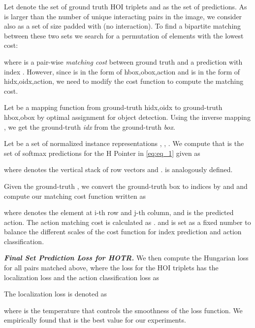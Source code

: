 \documentclass[final]{cvpr}
\begin{document}
Let  denote the set of ground truth HOI triplets and  as the set of  predictions.
As  is larger than the number of unique interacting pairs in the image, we consider  also as a set of size  padded with  (no interaction).
To find a bipartite matching between these two sets we search for a permutation of  elements  with the lowest cost:

where  is a pair-wise \textit{matching cost} between ground truth  and a prediction with index .
However, since  is in the form of hbox,obox,action and  is in the form of hidx,oidx,action, we need to modify the cost function to compute the matching cost.

Let  be a mapping function from ground-truth hidx,oidx to ground-truth hbox,obox by optimal assignment for object detection.
Using the inverse mapping , we get the ground-truth \textit{idx} from the ground-truth \textit{box}.

Let  be a set of normalized instance representations , \ie, .
We compute  that is the set of softmax predictions for the H Pointer in \eqref{eq:eq_1} given as

where  denotes the vertical stack of row vectors and .  is analogously defined.

Given the ground-truth , we convert the ground-truth box to indices by  and  and compute our matching cost function written as

where  denotes the element at i-th row and j-th column, and  is the predicted action.
The action matching cost is calculated as  .
 and  is set as a fixed number to balance the different scales of the cost function for index prediction and action classification.
\newline



\noindent\textit{\textbf{Final Set Prediction Loss for HOTR.}}
We then compute the Hungarian loss for all pairs matched above, where the loss for the HOI triplets has the localization loss and the action classification loss as

\newline
The localization loss  is denoted as

where  is the temperature that controls the smoothness of the loss function. We empirically found that  is the best value for our experiments.
\newline
\end{document}
